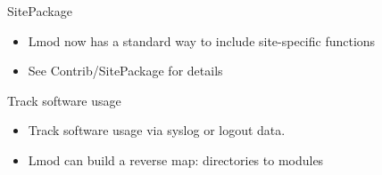 \documentclass{beamer}
\begin{document}
\begin{frame}{SitePackage}
  \begin{itemize}
    \item Lmod now has a standard way to include site-specific functions
    \item See Contrib/SitePackage for details
  \end{itemize}
\end{frame}


\begin{frame}{Track software usage}
  \begin{itemize}
    \item Track software usage via syslog or logout data.
    \item Lmod can build a reverse map: directories to modules
  \end{itemize}
\end{frame}

\end{document}
